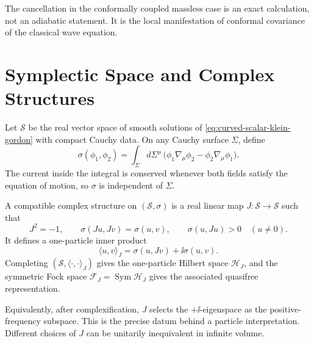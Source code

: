 The cancellation in the conformally coupled massless case is an exact
calculation, not an adiabatic statement.  It is the local manifestation of
conformal covariance of the classical wave equation.

\section{Symplectic Space and Complex Structures}

Let \(\mathcal S\) be the real vector space of smooth solutions of
\eqref{eq:curved-scalar-klein-gordon} with compact Cauchy data.  On any
Cauchy surface \(\Sigma\), define
\begin{equation}
  \sigma(\phi_1,\phi_2)
  =
  \int_\Sigma d\Sigma^\mu\,
  \bigl(
  \phi_1\nabla_\mu\phi_2
  -
  \phi_2\nabla_\mu\phi_1
  \bigr).
  \label{eq:covariant-symplectic-form}
\end{equation}
The current inside the integral is conserved whenever both fields satisfy
the equation of motion, so \(\sigma\) is independent of \(\Sigma\).

\begin{definition}
\label{def:compatible-complex-structure-cosmology}
A compatible complex structure on \((\mathcal S,\sigma)\) is a real linear
map \(J:\mathcal S\to\mathcal S\) such that
\begin{equation}
  J^2=-1,
  \qquad
  \sigma(Ju,Jv)=\sigma(u,v),
  \qquad
  \sigma(u,Ju)>0
  \quad (u\neq0).
  \label{eq:compatible-complex-structure}
\end{equation}
It defines a one-particle inner product
\begin{equation}
  \langle u,v\rangle_J
  =
  \sigma(u,Jv)+\ii\sigma(u,v).
  \label{eq:one-particle-inner-product-J}
\end{equation}
Completing \((\mathcal S,\langle\cdot,\cdot\rangle_J)\) gives the
one-particle Hilbert space \(\mathcal H_J\), and the symmetric Fock space
\(\mathcal F_J=\operatorname{Sym}\mathcal H_J\) gives the associated
quasifree representation.
\end{definition}

Equivalently, after complexification, \(J\) selects the \(+\ii\)-eigenspace as
the positive-frequency subspace.  This is the precise datum behind a
particle interpretation.  Different choices of \(J\) can be unitarily
inequivalent in infinite volume.

